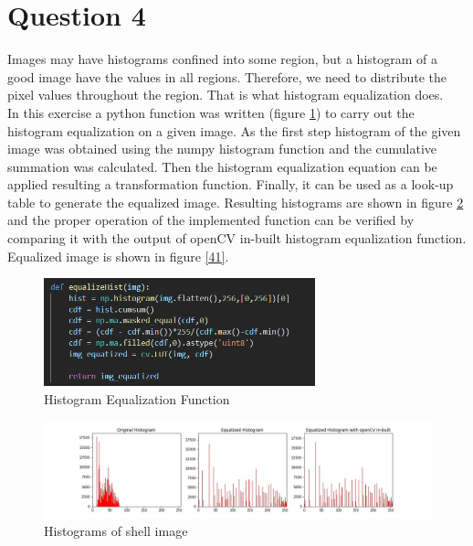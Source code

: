 \documentclass[11pt]{article}
\begin{document}
\section*{Question 4}

Images may have histograms confined into some region, but a histogram of a good image have the values in all regions. Therefore, we need to 
distribute the pixel values throughout the region. That is what histogram equalization does. \\

\noindent In this exercise a python function was written (figure \ref{Histogram Equalization Function}) to carry out the histogram equalization on a given image. As the first step histogram of the given image was
obtained using the numpy histogram function and the cumulative summation was calculated. Then the histogram equalization equation can be 
applied resulting a transformation function. Finally, it can be used as a look-up table to generate the equalized image.
Resulting histograms are shown in figure \ref{Histograms} and the proper operation of the implemented function can be verified by comparing it 
with the output of openCV in-built histogram equalization function. Equalized image is shown in figure \ref{41}.

\begin{figure}[!h]
    \centering
    \includegraphics[width=0.7\textwidth]{Images/40.PNG}
    \caption{Histogram Equalization Function}
    \label{Histogram Equalization Function}
\end{figure}

\begin{figure}[!h]
    \centering
    \includegraphics[width=\textwidth]{Images/42.jpg}
    \caption{Histograms of shell image}
    \label{Histograms}
\end{figure}
\end{document}
